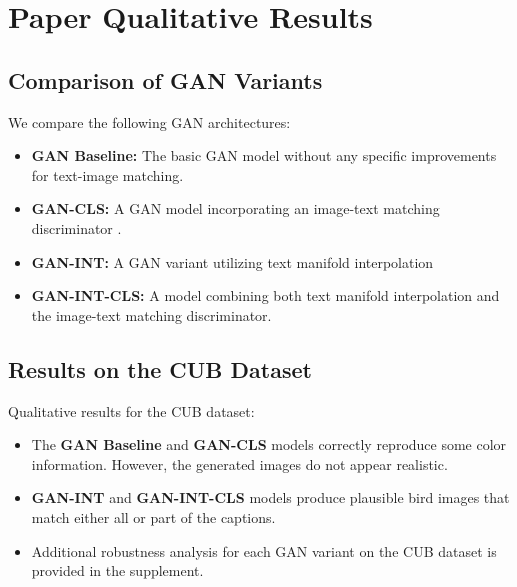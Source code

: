 \section*{Paper Qualitative Results}

\subsection*{Comparison of GAN Variants}

We compare the following GAN architectures:  
\begin{itemize}
    \item \textbf{GAN Baseline:} The basic GAN model without any specific improvements for text-image matching.  
    \item \textbf{GAN-CLS:} A GAN model incorporating an image-text matching discriminator .  
    \item \textbf{GAN-INT:} A GAN variant utilizing text manifold interpolation
    \item \textbf{GAN-INT-CLS:} A model combining both text manifold interpolation and the image-text matching discriminator.  
\end{itemize}

\subsection*{Results on the CUB Dataset}
Qualitative results for the CUB dataset:  
\begin{itemize}
    \item The \textbf{GAN Baseline} and \textbf{GAN-CLS} models correctly reproduce some color information. However, the generated images do not appear realistic.  
    \item \textbf{GAN-INT} and \textbf{GAN-INT-CLS} models produce plausible bird images that match either all or part of the captions.  
    \item Additional robustness analysis for each GAN variant on the CUB dataset is provided in the supplement.  
\end{itemize}

